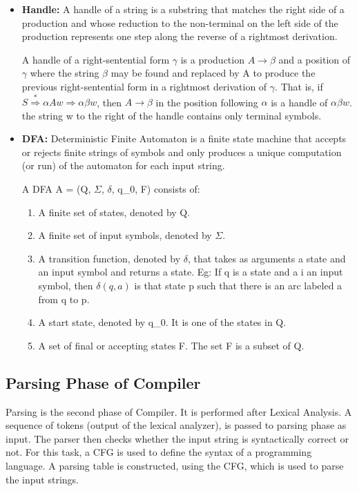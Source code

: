 \begin{itemize}
\item \textbf{Handle:} A handle of a string is a substring that matches the right side of a production and whose reduction to the non-terminal on the left side of the production represents one step along the reverse of a rightmost derivation. 

A handle of a right-sentential form $\gamma$ is a production $A \rightarrow \beta$ and a position of $\gamma$ where the string $\beta$ may be found and replaced by A to produce the previous right-sentential form in a rightmost derivation of $\gamma$. That is, if $S\overset{*}{\Rightarrow} \alpha Aw \Rightarrow \alpha \beta w$, then $A \rightarrow \beta$ in the position following $\alpha$ is a handle of $\alpha \beta w$. the string w to the right of the handle contains only terminal symbols.

\item \textbf{DFA:} Deterministic Finite Automaton is a finite state machine that accepts or rejects finite strings of symbols and only produces a unique computation (or run) of the automaton for each input string.

A DFA A = (Q, $\Sigma$, $\delta$, q_0, F) consists of:
\begin{enumerate}
\item A finite set of states, denoted by Q.
\item A finite set of input symbols, denoted by $\Sigma$.
\item A transition function, denoted by $\delta$, that takes as arguments a state and an input symbol and returns a state. Eg: If q is a state and a i an input symbol, then $\delta(q,a)$ is that state p such that there is an arc labeled a from q to p.
\item A start state, denoted by q_0. It is one of the states in Q.
\item A set of final or accepting states F. The set F is a subset of Q.
\end{enumerate}

\end{itemize}

\subsection{Parsing Phase of Compiler}
\label{subsec:Parsing Phase}
Parsing is the second phase of Compiler. It is performed after Lexical Analysis. A sequence of tokens (output of the lexical analyzer), is passed to parsing phase as input. The parser then checks whether the input string is syntactically correct or not. For this task, a CFG is used to define the syntax of a programming language. A parsing table is constructed, using the CFG, which is used to parse the input strings.

